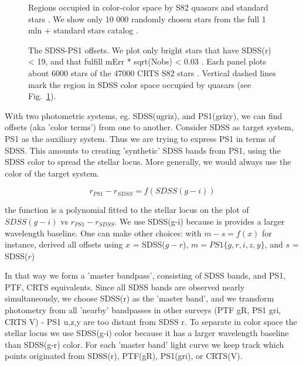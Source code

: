 \documentclass[twocolumn]{aastex62}
\begin{document}
\begin{figure}
\caption{Regions occupied in color-color space by S82 quasars and standard stars \citep{schneider2010}. We show only 10 000  randomly chosen stars from the  full 1 mln + standard stars catalog \citealt{ivezic2007}. }
\label{fig:quasarColors}
\end{figure} 


\begin{figure}
\caption{The SDSS-PS1 offsets. We plot only bright stars that have SDSS(r) < 19, and that fulfill  mErr * sqrt(Nobs) < 0.03 . Each panel plots about 6000 stars of the 47000 CRTS S82 stars . Vertical dashed lines mark the region in SDSS color space occupied by quasars (see Fig.~\ref{fig:quasarColors}). }
\label{fig:offsetsPS1}
\end{figure} 


With two photometric systems, eg. SDSS(ugriz), and PS1(grizy),  we can find offsets (aka 'color terms') from one to another. Consider SDSS as target system,  PS1 as the auxiliary system. Thus we are trying  to express PS1 in terms of SDSS. This amounts to creating 'synthetic' SDSS bands from PS1, using the SDSS color to spread the stellar locus. More generally, we would always use the color of the target system. 

\begin{equation}
r_{PS1} -  r_{SDSS} = f ( SDSS (g-i ))
\end{equation}

the function is a polynomial fitted to the stellar locus on the plot of $SDSS (g-i )$ vs $r_{PS1} -  r_{SDSS} $. We use SDSS(g-i) because is provides a larger wavelength baseline. One can make other choices: with $m - s = f(x)$  for instance, \cite{tonry2012} derived all offsets using $x$ = SDSS($g-r$), $m = PS1 \{g,r,i,z,y\}$, and $s$ = SDSS($r$)

In that way we form a 'master bandpass', consisting of SDSS bands, and PS1, PTF, CRTS equivalents.  Since all SDSS bands are observed nearly simultaneously, we choose SDSS(r) as the 'master band', and we transform photometry from all 'nearby' bandpasses in other surveys (PTF gR,  PS1 gri, CRTS V) - PS1 u,z,y are too distant from SDSS r. To separate in color space the stellar locus we use SDSS(g-i) color because it has a larger wavelength baseline than SDSS(g-r) color.  For each 'master band' light curve we keep track which points originated from SDSS(r),  PTF(gR), PS1(gri), or CRTS(V). 
\end{document}
